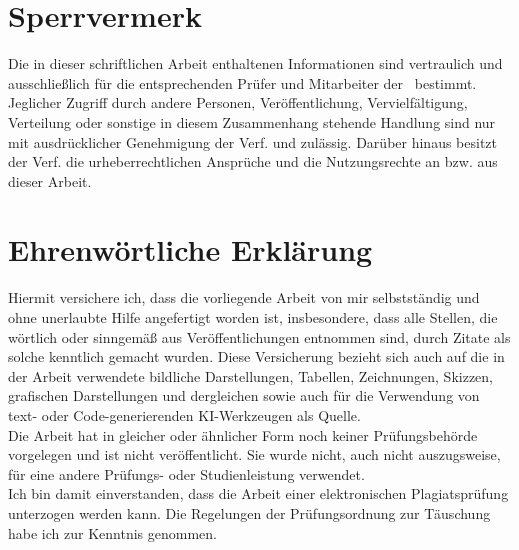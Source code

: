 \documentclass[a4paper, 11pt, german]{article}
\def\True{1}
\begin{document}
\clearpage
{}
\tableofcontents
\clearpage

\if\Acronyms\True
	\section*{\acrotitle}
	
	\clearpage
\fi



\if\Sperrvermerk \True
 \section*{Sperrvermerk}
 Die in dieser schriftlichen Arbeit enthaltenen Informationen sind vertraulich und ausschließlich
 für die entsprechenden Prüfer und Mitarbeiter der \Hochschulname~bestimmt.
Jeglicher Zugriff durch andere Personen, Veröffentlichung, Vervielfältigung,
Verteilung oder sonstige in diesem Zusammenhang stehende Handlung sind nur mit ausdrücklicher
Genehmigung der Verf. und \Firma\space zulässig. Darüber hinaus besitzt der
Verf. die urheberrecht\-lichen Ansprüche und \Firma\space die Nutzungsrechte
an bzw. aus dieser Arbeit.
\clearpage
\fi




  
  
  

\printbibliography



\clearpage
\section*{Ehrenwörtliche Erklärung}
Hiermit versichere ich, dass die vorliegende Arbeit von mir selbstständig und ohne unerlaubte Hilfe
angefertigt worden ist, insbesondere, dass alle Stellen, die wörtlich oder sinngemäß aus
Veröffentlichungen entnommen sind, durch Zitate als solche kenntlich gemacht wurden.
Diese Versicherung bezieht sich auch auf die in der Arbeit verwendete bildliche Darstellungen,
Tabellen, Zeichnungen, Skizzen, grafischen Darstellungen und dergleichen sowie auch für die
Verwendung von text- oder Code-generierenden KI-Werkzeugen als Quelle.
\vspace{1ex}\\
Die Arbeit hat in gleicher oder ähnlicher Form noch keiner Prüfungsbehörde vorgelegen und ist nicht
veröffentlicht. Sie wurde nicht, auch nicht auszugsweise, für eine andere Prüfungs- oder
Studienleistung verwendet.
\vspace{1ex}\\
Ich bin damit einverstanden, dass die Arbeit einer elektronischen Plagiatsprüfung unterzogen werden
kann. Die Regelungen der Prüfungsordnung zur Täuschung habe ich zur Kenntnis genommen.


%
%
\end{document}
